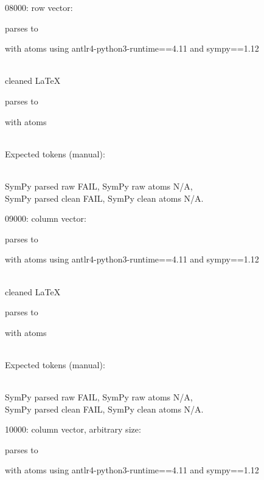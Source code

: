\documentclass{article}
\begin{document}
08000:
row vector:

parses to

with atoms
using antlr4-python3-runtime==4.11 and sympy==1.12

\ \\
cleaned \LaTeX

parses to

with atoms


\ \\
Expected tokens (manual):


\ \\
SymPy parsed raw FAIL, 
SymPy raw atoms N/A, \\
SymPy parsed clean FAIL, 
SymPy clean atoms N/A.

\hrulefill

09000:
column vector:

parses to

with atoms
using antlr4-python3-runtime==4.11 and sympy==1.12

\ \\
cleaned \LaTeX

parses to

with atoms


\ \\
Expected tokens (manual):



\ \\
SymPy parsed raw FAIL, 
SymPy raw atoms N/A, \\
SymPy parsed clean FAIL, 
SymPy clean atoms N/A.

\hrulefill

10000:
column vector, arbitrary size:

parses to

with atoms
using antlr4-python3-runtime==4.11 and sympy==1.12
\end{document}
